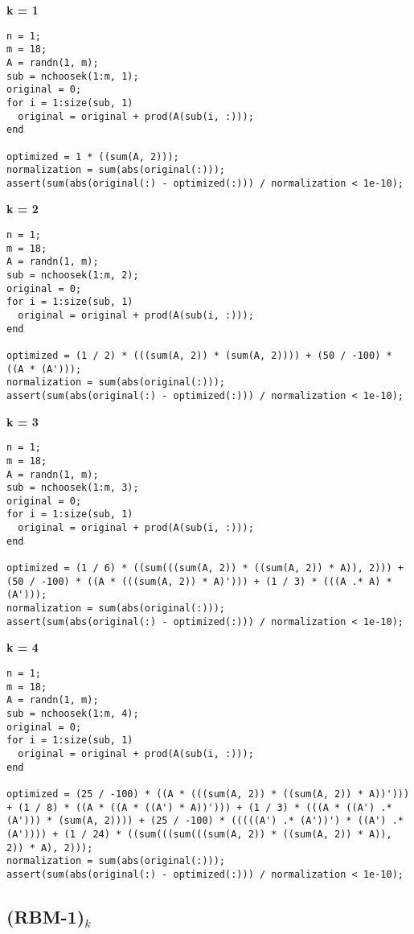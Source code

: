 {\bf k = 1}

\begin{lstlisting}
n = 1;
m = 18;
A = randn(1, m);
sub = nchoosek(1:m, 1);
original = 0;
for i = 1:size(sub, 1)
  original = original + prod(A(sub(i, :)));
end

optimized = 1 * ((sum(A, 2)));
normalization = sum(abs(original(:)));
assert(sum(abs(original(:) - optimized(:))) / normalization < 1e-10);
\end{lstlisting}


{\bf k = 2}

\begin{lstlisting}
n = 1;
m = 18;
A = randn(1, m);
sub = nchoosek(1:m, 2);
original = 0;
for i = 1:size(sub, 1)
  original = original + prod(A(sub(i, :)));
end

optimized = (1 / 2) * (((sum(A, 2)) * (sum(A, 2)))) + (50 / -100) * ((A * (A')));
normalization = sum(abs(original(:)));
assert(sum(abs(original(:) - optimized(:))) / normalization < 1e-10);
\end{lstlisting}


{\bf k = 3}

\begin{lstlisting}
n = 1;
m = 18;
A = randn(1, m);
sub = nchoosek(1:m, 3);
original = 0;
for i = 1:size(sub, 1)
  original = original + prod(A(sub(i, :)));
end

optimized = (1 / 6) * ((sum(((sum(A, 2)) * ((sum(A, 2)) * A)), 2))) + (50 / -100) * ((A * (((sum(A, 2)) * A)'))) + (1 / 3) * (((A .* A) * (A')));
normalization = sum(abs(original(:)));
assert(sum(abs(original(:) - optimized(:))) / normalization < 1e-10);
\end{lstlisting}


{\bf k = 4}

\begin{lstlisting}
n = 1;
m = 18;
A = randn(1, m);
sub = nchoosek(1:m, 4);
original = 0;
for i = 1:size(sub, 1)
  original = original + prod(A(sub(i, :)));
end

optimized = (25 / -100) * ((A * (((sum(A, 2)) * ((sum(A, 2)) * A))'))) + (1 / 8) * ((A * ((A * ((A') * A))'))) + (1 / 3) * (((A * ((A') .* (A'))) * (sum(A, 2)))) + (25 / -100) * (((((A') .* (A'))') * ((A') .* (A')))) + (1 / 24) * ((sum(((sum(((sum(A, 2)) * ((sum(A, 2)) * A)), 2)) * A), 2)));
normalization = sum(abs(original(:)));
assert(sum(abs(original(:) - optimized(:))) / normalization < 1e-10);
\end{lstlisting}


\subsection{{\bf (RBM-1)$_k$}}



